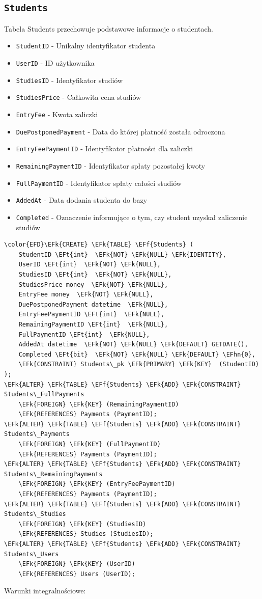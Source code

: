 \documentclass[11pt]{article}
\newcommand{\EFk}[1]{\textcolor{EFk}{\textbf{#1}}} %
\newcommand{\EFf}[1]{\textcolor{EFf}{#1}} %
\newcommand{\EFt}[1]{\textcolor{EFt}{\textbf{#1}}} %
\newcommand{\EFhn}[1]{\textcolor{EFhn}{#1}} %
\begin{document}
\subsection{\texttt{Students}}
\label{sec:org648a33e}
Tabela Students przechowuje podstawowe informacje o studentach.
\begin{itemize}
\item \texttt{StudentID} - Unikalny identyfikator studenta
\item \texttt{UserID} - ID użytkownika
\item \texttt{StudiesID} - Identyfikator studiów
\item \texttt{StudiesPrice} - Całkowita cena studiów
\item \texttt{EntryFee} - Kwota zaliczki
\item \texttt{DuePostponedPayment} - Data do której płatność została odroczona
\item \texttt{EntryFeePaymentID} - Identyfikator płatności dla zaliczki
\item \texttt{RemainingPaymentID} - Identyfikator spłaty pozostałej kwoty
\item \texttt{FullPaymentID} - Identyfikator spłaty całości studiów
\item \texttt{AddedAt} - Data dodania studenta do bazy
\item \texttt{Completed} - Oznaczenie informujące o tym, czy student uzyskał zaliczenie studiów
\end{itemize}
\begin{Code}
\begin{Verbatim}
\color{EFD}\EFk{CREATE} \EFk{TABLE} \EFf{Students} (
    StudentID \EFt{int}  \EFk{NOT} \EFk{NULL} \EFk{IDENTITY},
    UserID \EFt{int}  \EFk{NOT} \EFk{NULL},
    StudiesID \EFt{int}  \EFk{NOT} \EFk{NULL},
    StudiesPrice money  \EFk{NOT} \EFk{NULL},
    EntryFee money  \EFk{NOT} \EFk{NULL},
    DuePostponedPayment datetime  \EFk{NULL},
    EntryFeePaymentID \EFt{int}  \EFk{NULL},
    RemainingPaymentID \EFt{int}  \EFk{NULL},
    FullPaymentID \EFt{int}  \EFk{NULL},
    AddedAt datetime  \EFk{NOT} \EFk{NULL} \EFk{DEFAULT} GETDATE(),
    Completed \EFt{bit}  \EFk{NOT} \EFk{NULL} \EFk{DEFAULT} \EFhn{0},
    \EFk{CONSTRAINT} Students\_pk \EFk{PRIMARY} \EFk{KEY}  (StudentID)
);
\EFk{ALTER} \EFk{TABLE} \EFf{Students} \EFk{ADD} \EFk{CONSTRAINT} Students\_FullPayments
    \EFk{FOREIGN} \EFk{KEY} (RemainingPaymentID)
    \EFk{REFERENCES} Payments (PaymentID);
\EFk{ALTER} \EFk{TABLE} \EFf{Students} \EFk{ADD} \EFk{CONSTRAINT} Students\_Payments
    \EFk{FOREIGN} \EFk{KEY} (FullPaymentID)
    \EFk{REFERENCES} Payments (PaymentID);
\EFk{ALTER} \EFk{TABLE} \EFf{Students} \EFk{ADD} \EFk{CONSTRAINT} Students\_RemainingPayments
    \EFk{FOREIGN} \EFk{KEY} (EntryFeePaymentID)
    \EFk{REFERENCES} Payments (PaymentID);
\EFk{ALTER} \EFk{TABLE} \EFf{Students} \EFk{ADD} \EFk{CONSTRAINT} Students\_Studies
    \EFk{FOREIGN} \EFk{KEY} (StudiesID)
    \EFk{REFERENCES} Studies (StudiesID);
\EFk{ALTER} \EFk{TABLE} \EFf{Students} \EFk{ADD} \EFk{CONSTRAINT} Students\_Users
    \EFk{FOREIGN} \EFk{KEY} (UserID)
    \EFk{REFERENCES} Users (UserID);
\end{Verbatim}
\end{Code}
Warunki integralnościowe:
\end{document}
